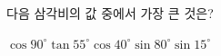 다음 삼각비의 값 중에서 가장 큰 것은?
\begin{choices32}{$\cos 90^\circ$}{$\tan 55^\circ$}{$\cos 40^\circ$}{$\sin 80^\circ$}{$\sin 15^\circ$}\end{choices32}
